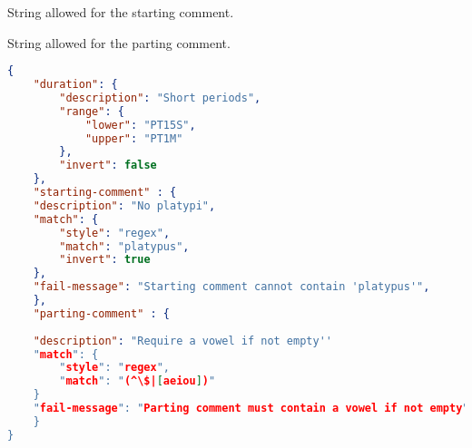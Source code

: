 \documentclass[10pt]{article}
\begin{document}
 String allowed for the starting comment.

 String allowed for the parting comment.


\example
\begin{lstlisting}[language=json]
{
    "duration": {
        "description": "Short periods",
        "range": {
            "lower": "PT15S",
            "upper": "PT1M"
        },
        "invert": false
    },
    "starting-comment" : {
	"description": "No platypi",
	"match": {
	    "style": "regex",
	    "match": "platypus",
	    "invert": true
	},
	"fail-message": "Starting comment cannot contain 'platypus'",
    },
    "parting-comment" : {
     
	"description": "Require a vowel if not empty''
	"match": {
	    "style": "regex",
	    "match": "(^\$|[aeiou])"
	}
	"fail-message": "Parting comment must contain a vowel if not empty", 
    }
}

\end{lstlisting}
\end{document}
